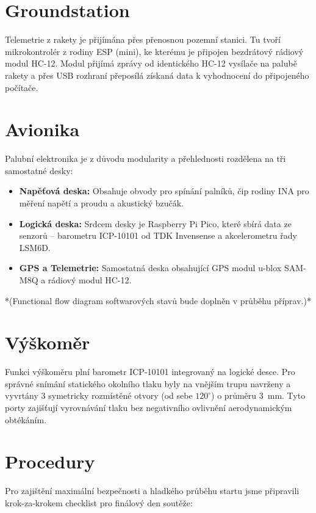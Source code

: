 \documentclass[a4paper,12pt]{article}
\begin{document}
\section{Groundstation}
Telemetrie z rakety je přijímána přes přenosnou pozemní stanici. Tu tvoří mikrokontrolér z rodiny ESP (mini), ke kterému je připojen bezdrátový rádiový modul HC-12. Modul přijímá zprávy od identického HC-12 vysílače na palubě rakety a přes USB rozhraní přeposílá získaná data k vyhodnocení do připojeného počítače.

\section{Avionika}
Palubní elektronika je z důvodu modularity a přehlednosti rozdělena na tři samostatné desky:
\begin{itemize}
    \item \textbf{Napěťová deska:} Obsahuje obvody pro spínání palníků, čip rodiny INA pro měření napětí a proudu a akustický bzučák.
    \item \textbf{Logická deska:} Srdcem desky je Raspberry Pi Pico, které sbírá data ze senzorů -- barometru ICP-10101 od TDK Invensense a akcelerometru řady LSM6D.
    \item \textbf{GPS a Telemetrie:} Samostatná deska obsahující GPS modul u-blox SAM-M8Q a rádiový modul HC-12.
\end{itemize}

*(Functional flow diagram softwarových stavů bude doplněn v průběhu příprav.)*

\section{Výškoměr}
Funkci výškoměru plní barometr ICP-10101 integrovaný na logické desce. Pro správné snímání statického okolního tlaku byly na vnějším trupu navrženy a vyvrtány 3 symetricky rozmístěné otvory (od sebe $120^\circ$) o průměru 3~mm. Tyto porty zajišťují vyrovnávání tlaku bez negativního ovlivnění aerodynamickým obtékáním.

\section{Procedury}
Pro zajištění maximální bezpečnosti a hladkého průběhu startu jsme připravili krok-za-krokem checklist pro finálový den soutěže:
\end{document}
